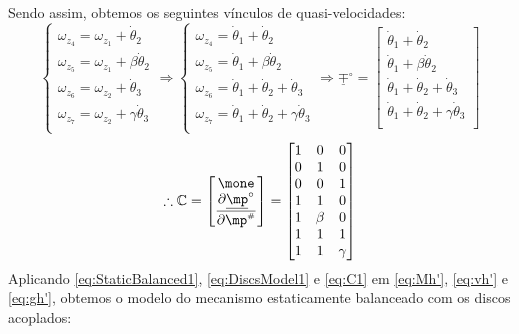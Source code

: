 \documentclass[a4paper,11pt,brazil,fleqn]{article}
\begin{document}
Sendo assim, obtemos os seguintes v\'{i}nculos de quasi-velocidades:
\begin{equation}\label{eq:Quasi-velocitiesConstraints1}
\begin{cases}
\omega_{z_4} = \omega_{z_1} + \dot{\theta}_2 \\
\omega_{z_5} = \omega_{z_1} + \beta\dot{\theta}_2 \\
\omega_{z_6} = \omega_{z_2} + \dot{\theta}_3 \\
\omega_{z_7} = \omega_{z_2} + \gamma\dot{\theta}_3 \\
\end{cases}
\Rightarrow
\begin{cases}
\omega_{z_4} = \dot{\theta}_1 + \dot{\theta}_2 \\
\omega_{z_5} = \dot{\theta}_1 + \beta\dot{\theta}_2 \\
\omega_{z_6} = \dot{\theta}_1 + \dot{\theta}_2 + \dot{\theta}_3 \\
\omega_{z_7} = \dot{\theta}_1 + \dot{\theta}_2 + \gamma\dot{\theta}_3 \\
\end{cases}
\Rightarrow
\underline{\mp}^\circ = 
\begin{bmatrix}
\dot{\theta}_1 + \dot{\theta}_2 \\
\dot{\theta}_1 + \beta\dot{\theta}_2 \\
\dot{\theta}_1 + \dot{\theta}_2 + \dot{\theta}_3 \\
\dot{\theta}_1 + \dot{\theta}_2 + \gamma\dot{\theta}_3 \\
\end{bmatrix}
\end{equation}
\begin{equation}\label{eq:C1}
\therefore\mC =
\begin{bmatrix}
\mone \\
\displaystyle\frac{\partial \underline{\mp}^\circ}{\partial \mp\ssh}
\end{bmatrix}  =
\begin{bmatrix}
1 & 0 & 0 \\
0 & 1 & 0 \\
0 & 0 & 1 \\
1 & 1     & 0 \\
1 & \beta & 0 \\
1 & 1     & 1 \\
1 & 1     & \gamma \\
\end{bmatrix} 
\end{equation}
Aplicando \eqref{eq:StaticBalanced1}, \eqref{eq:DiscsModel1} e \eqref{eq:C1} em \eqref{eq:Mh'}, \eqref{eq:vh'} e \eqref{eq:gh'}, obtemos o modelo do mecanismo estaticamente balanceado com os discos acoplados:
\end{document}
